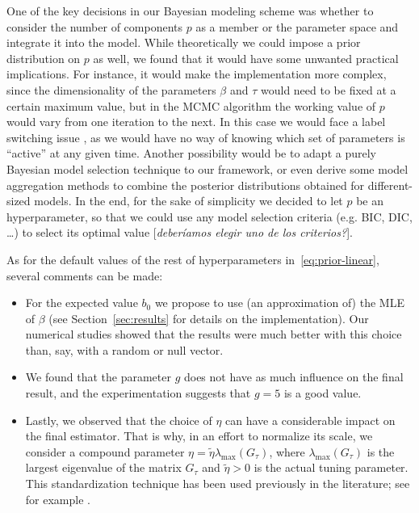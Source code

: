 \documentclass[ba]{imsart}
\numberwithin{equation}{section}
\theoremstyle{plain}
\newcommand\incomment[1]{\color{red}[\textit{#1}]\color{black}}
\begin{document}
One of the key decisions in our Bayesian modeling scheme was whether to consider the number of components \(p\) as a member or the parameter space and integrate it into the model. While theoretically we could impose a prior distribution on \(p\) as well, we found that it would have some unwanted practical implications. For instance, it would make the implementation more complex, since the dimensionality of the parameters \(\beta\) and \(\tau\) would need to be fixed at a certain maximum value, but in the MCMC algorithm the working value of \(p\) would vary from one iteration to the next. In this case we would face a label switching issue \citep[c.f.][Sec.~2.3]{grollemund2019bayesian}, as we would have no way of knowing which set of parameters is ``active'' at any given time. Another possibility would be to adapt a purely Bayesian model selection technique \citep[see][Ch.~7]{piironen2017comparison, gelman1995bayesian} to our framework, or even derive some model aggregation methods to combine the posterior distributions obtained for different-sized models. In the end, for the sake of simplicity we decided to let \(p\) be an hyperparameter, so that we could use any model selection criteria (e.g. BIC, DIC, \ldots) to select its optimal value \incomment{deberíamos elegir uno de los criterios?}.

As for the default values of the rest of hyperparameters in~\eqref{eq:prior-linear}, several comments can be made:
\begin{itemize}
  \item For the expected value \(b_0\) we propose to use (an approximation of) the MLE of \(\beta\) (see Section~\ref{sec:results} for details on the implementation). Our numerical studies showed that the results were much better with this choice than, say, with a random or null vector.
  \item We found that the parameter \(g\) does not have as much influence on the final result, and the experimentation suggests that \(g=5\) is a good value.
  \item Lastly, we observed that the choice of \(\eta\) can have a considerable impact on the final estimator. That is why, in an effort to normalize its scale, we consider a compound parameter \(\eta = \tilde \eta \lambda_{\max}(G_\tau)\), where \(\lambda_{\max}(G_\tau)\) is the largest eigenvalue of the matrix \(G_\tau\) and \(\tilde\eta > 0\) is the actual tuning parameter. This standardization technique has been used previously in the literature; see for example \citet{grollemund2019bayesian}.
\end{itemize}
\end{document}
